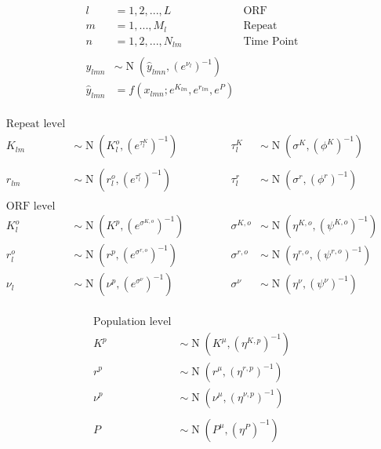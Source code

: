 \documentclass[11pt,a4paper]{article}
\begin{document}
\begin{align*}
l&=1,2,...,L \qquad &\text{ORF}\\
m&=1,...,M_{l} \qquad &\text{Repeat}\\
n&=1,2,...,N_{lm} \qquad &\text{Time Point}\\
\\
y_{lmn} &\sim \operatorname{N}(\hat{y}_{lmn},(e^{ \nu_{l}  })^{-1} ) \\
\hat{y}_{lmn} &= f(x_{lmn};e^{ K_{lm} } ,e^{ r_{lm} } , e^{ P })\\
\end{align*}



\begin{align*}
\text{Repeat level}\\
K_{lm} &\sim \operatorname{N}(K_{l}^o, (e^{ \tau_{l}^K })^{-1} )\qquad\qquad &\tau_{l}^K &\sim \operatorname{N}(\sigma^{K}, (\phi^{K})^{-1} )\\
\\
r_{lm} &\sim \operatorname{N}(r_{l}^o, (e^{ \tau_{l}^r })^{-1} )  &\tau_{l}^r &\sim \operatorname{N}(\sigma^{r}, (\phi^{r})^{-1} )\\
\\
\text{ORF level}\\
K_{l}^o &\sim \operatorname{N}(K^p, (e^{ \sigma^{K,o} })^{-1} )&\sigma^{K,o} &\sim \operatorname{N}(\eta^{K,o}, (\psi^{K,o})^{-1} )\\
r_{l}^o &\sim \operatorname{N}(r^p, (e^{ \sigma^{r,o} })^{-1} )&\sigma^{r,o} &\sim \operatorname{N}(\eta^{r,o}, (\psi^{r,o})^{-1} )\\
\nu_{l} &\sim \operatorname{N}(\nu^p, (e^{ {\sigma}^{\nu} })^{-1} )&\sigma^{\nu} &\sim \operatorname{N}(\eta^{\nu}, (\psi^{\nu})^{-1} )\\
\end{align*}

\begin{align*}
\text{Population level}\\
K^p &\sim \operatorname{N}(K^\mu, ({\eta^{K,p}})^{-1} )\\
r^p &\sim \operatorname{N}(r^\mu, ({\eta^{r,p}})^{-1} )\\
\nu^p &\sim \operatorname{N}(\nu^\mu, (\eta^{\nu,p})^{-1} )\\
\\
P &\sim \operatorname{N}(P^\mu, ({\eta^{P}})^{-1} )\\
\end{align*}

\newpage




\end{document}
